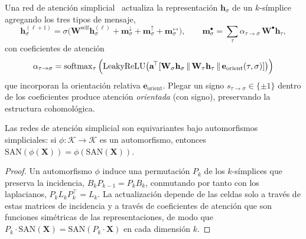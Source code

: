 \begin{definition}
\label{def:gauge:simplicial-attention}
Una red de atenci\'on simplicial~\citep{giusti2022simplicial} actualiza la
representaci\'on $\mathbf{h}_\sigma$ de un $k$-s\'implice agregando los tres tipos
de mensaje,
\[
  \mathbf{h}_\sigma^{(\ell+1)} = \sigma\!\Big(\mathbf{W}^{\text{self}}
  \mathbf{h}_\sigma^{(\ell)} + \mathbf{m}_\sigma^{\downarrow} +
  \mathbf{m}_\sigma^{\uparrow} + \mathbf{m}_\sigma^{\leftrightarrow}\Big),
  \qquad
  \mathbf{m}_\sigma^{\bullet} = \sum_\tau \alpha_{\tau\to\sigma}\,
  \mathbf{W}^{\bullet}\mathbf{h}_\tau,
\]
con coeficientes de atenci\'on
\[
  \alpha_{\tau\to\sigma} = \operatorname{softmax}_\tau\Big(\mathrm{LeakyReLU}\big(\mathbf{a}^{\!\top}
  [\mathbf{W}_\sigma\mathbf{h}_\sigma \,\|\, \mathbf{W}_\tau\mathbf{h}_\tau \,\|\,
  \mathbf{e}_{\text{orient}}(\tau, \sigma)]\big)\Big)
\]
que incorporan la orientaci\'on relativa $\mathbf{e}_{\text{orient}}$. Plegar un
signo $s_{\tau\to\sigma} \in \{\pm 1\}$ dentro de los coeficientes produce
atenci\'on \emph{orientada} (con signo), preservando la estructura
cohomol\'ogica.
\end{definition}

\begin{theorem}
\label{thm:gauge:simplicial-equivariance}
Las redes de atenci\'on simplicial son equivariantes bajo automorfismos
simpliciales: si $\phi\colon \mathcal{K} \to \mathcal{K}$ es un automorfismo,
entonces $\mathrm{SAN}(\phi(\mathbf{X})) = \phi(\mathrm{SAN}(\mathbf{X}))$.
\end{theorem}

\begin{proof}
Un automorfismo $\phi$ induce una permutaci\'on $P_k$ de los $k$-s\'implices que
preserva la incidencia, $B_k P_{k-1} = P_k B_k$, conmutando por tanto con los
laplacianos, $P_k L_k P_k^{\!\top} = L_k$. La actualizaci\'on depende de las
celdas solo a trav\'es de estas matrices de incidencia y a trav\'es de
coeficientes de atenci\'on que son funciones sim\'etricas de las
representaciones, de modo que $P_k\cdot\mathrm{SAN}(\mathbf{X}) =
\mathrm{SAN}(P_k\cdot\mathbf{X})$ en cada dimensi\'on $k$.
\end{proof}

